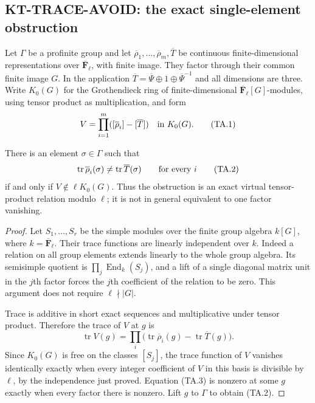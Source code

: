 \subsection{KT-TRACE-AVOID: the exact single-element obstruction}
\label{sec:kt-trace-avoid}

Let $\Gamma$ be a profinite group and let
$\overline\rho_1,\ldots,\overline\rho_m,\overline T$
be continuous finite-dimensional representations over
$\overline{\mathbf F}_\ell$, with finite image. They
factor through their common finite image $G$. In the
application $\overline T=\overline\Psi\oplus1\oplus
\overline\Psi^{-1}$ and all dimensions are three.
Write $K_0(G)$ for the Grothendieck ring of finite-dimensional
$\overline{\mathbf F}_\ell[G]$-modules, using tensor product
as multiplication, and form
\[
        V=\prod_{i=1}^m([\overline\rho_i]-[\overline T])
                          \quad\hbox{in }K_0(G).
                                                               \tag{TA.1}
\]

\begin{proposition}
There is an element $\sigma\in\Gamma$ such that
\[
 \operatorname{tr}\overline\rho_i(\sigma)
       \ne\operatorname{tr}\overline T(\sigma)
                     \qquad\hbox{for every }i
                                                               \tag{TA.2}
\]
if and only if $V\notin\ell K_0(G)$. Thus the obstruction
is an exact virtual tensor-product relation modulo $\ell$;
it is not in general equivalent to one factor vanishing.
\end{proposition}

\begin{proof}
Let $S_1,\ldots,S_r$ be the simple modules over the finite
group algebra $k[G]$, where $k=\overline{\mathbf F}_\ell$.
Their trace functions are linearly independent over $k$.
Indeed a relation on all group elements extends linearly
to the whole group algebra. Its semisimple quotient is
$\prod_j\operatorname{End}_k(S_j)$, and a lift of a single
diagonal matrix unit in the $j$th factor forces the $j$th
coefficient of the relation to be zero. This argument
does not require $\ell\nmid|G|$.

Trace is additive in short exact sequences and multiplicative
under tensor product. Therefore the trace of $V$ at $g$ is
\[
 \operatorname{tr}V(g)=
 \prod_i\bigl(\operatorname{tr}\overline\rho_i(g)
                   -\operatorname{tr}\overline T(g)\bigr).
                                                               \tag{TA.3}
\]
Since $K_0(G)$ is free on the classes $[S_j]$, the trace
function of $V$ vanishes identically exactly when every
integer coefficient of $V$ in this basis is divisible by
$\ell$, by the independence just proved. Equation (TA.3)
is nonzero at some $g$ exactly when every factor there is
nonzero. Lift $g$ to $\Gamma$ to obtain (TA.2).
\end{proof}

